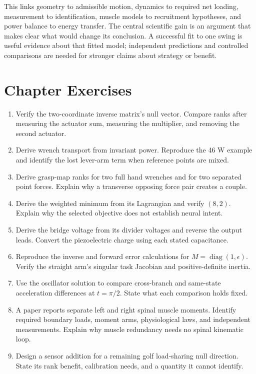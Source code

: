 This links geometry to admissible motion, dynamics to required net loading,
measurement to identification, muscle models to recruitment hypotheses, and
power balance to energy transfer. The central scientific gain is an argument
that makes clear what would change its conclusion. A successful fit to one
swing is useful evidence about that fitted model; independent predictions and
controlled comparisons are needed for stronger claims about strategy or benefit.

\section{Chapter Exercises}

\begin{enumerate}
\item Verify the two-coordinate inverse matrix's null vector. Compare ranks
      after measuring the actuator sum, measuring the multiplier, and removing
      the second actuator.
\item Derive wrench transport from invariant power. Reproduce the 46 W example
      and identify the lost lever-arm term when reference points are mixed.
\item Derive grasp-map ranks for two full hand wrenches and for two separated
      point forces. Explain why a transverse opposing force pair creates a couple.
\item Derive the weighted minimum from its Lagrangian and verify $(8,2)$.
      Explain why the selected objective does not establish neural intent.
\item Derive the bridge voltage from its divider voltages and reverse the output
      leads. Convert the piezoelectric charge using each stated capacitance.
\item Reproduce the inverse and forward error calculations for
      $M=\operatorname{diag}(1,\epsilon)$. Verify the straight arm's singular task
      Jacobian and positive-definite inertia.
\item Use the oscillator solution to compare cross-branch and same-state
      acceleration differences at $t=\pi/2$. State what each comparison holds fixed.
\item A paper reports separate left and right spinal muscle moments. Identify
      required boundary loads, moment arms, physiological laws, and independent
      measurements. Explain why muscle redundancy needs no spinal kinematic loop.
\item Design a sensor addition for a remaining golf load-sharing null direction.
      State its rank benefit, calibration needs, and a quantity it cannot identify.
\end{enumerate}
